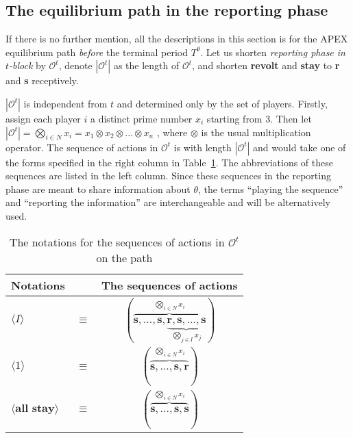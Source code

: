 \documentclass[12pt,letter]{article}
\newcommand{\Omicron}{\mathcal{O}}
\theoremstyle{definition}
\theoremstyle{remark}
\theoremstyle{claim}
\begin{document}
\subsection{The equilibrium path in the reporting phase}
\label{sec:eq_rp}
If there is no further mention, all the descriptions in this section is for the APEX equilibrium path \textit{before} the terminal period $T^{\theta}$. Let us shorten \textit{reporting phase in $t$-block} by $\Omicron^{t}$, denote $|\Omicron^t|$ as the length of $\Omicron^{t}$, and shorten \textbf{revolt} and \textbf{stay} to \textbf{r} and \textbf{s} receptively. 

$|\Omicron^{t}|$ is independent from $t$ and determined only by the set of players. Firstly, assign each player $i$ a distinct prime number $x_i$ starting from $3$. Then let $|\Omicron^{t}|=\bigotimes_{i\in N} x_i=x_1\otimes x_2\otimes...\otimes x_n$ , where $\otimes$ is the usual multiplication operator. The sequence of actions in $\Omicron^{t}$ is with length $|\Omicron^t|$ and would take one of the forms specified in the right column in Table~\ref{Table_msg_form}. The abbreviations of these sequences are listed in the left column. Since these sequences in the reporting phase are meant to share information about $\theta$, the terms ``playing the sequence'' and ``reporting the information'' are interchangeable and will be alternatively used.


\begin{table}[!htbp]
\caption{The notations for the sequences of actions in $\Omicron^t$ on the path}
\label{Table_msg_form}
\begin{center}
\begin{tabular}{l c c}
Notations && The sequences of actions\\
\hline
\hline
$\langle  I \rangle$ 				& $\equiv$ 			& $(\overbrace{\textbf{s},...,\textbf{s},\underbrace{\textbf{r},\textbf{s},...,\textbf{s}}_{\bigotimes_{j\in I}x_j} }^{\bigotimes_{i\in N} x_i})$  \\
$\langle 1 \rangle$	 					& $\equiv$ 			& $( \overbrace{\textbf{s},...,\textbf{s},{\textbf{r}} }^{\bigotimes_{i\in N} x_i} )$  \\
$\langle \textbf{all stay} \rangle$	 					& $\equiv$ 			& $(\overbrace{ \textbf{s},...,\textbf{s},{\textbf{s}} }^{\bigotimes_{i\in N} x_i})$  \\
\hline
\end{tabular}
\end{center}
\end{table}
\end{document}
